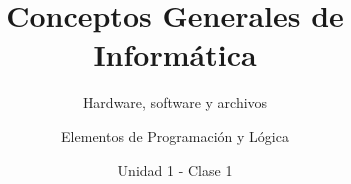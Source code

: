 \documentclass[usenames,dvipsnames]{../../common/beamerUNQ}
\title{Conceptos Generales de Informática}
\subtitle{Hardware, software y archivos}
\author{Elementos de Programación y Lógica}
\date{Unidad 1 - Clase 1}
\begin{document}
  \titleframe
  \toc
  
  \finaltitleframe
\end{document}
